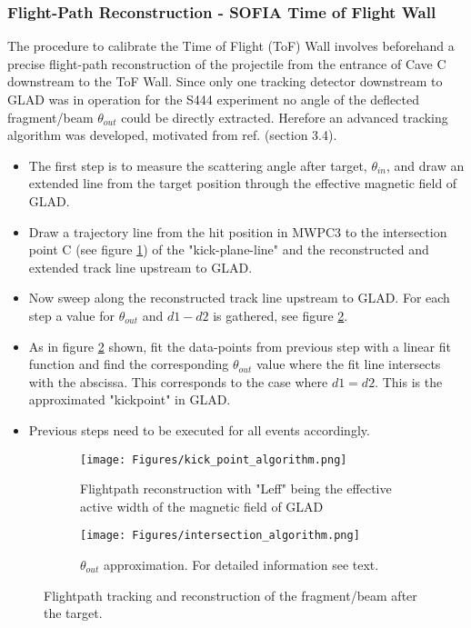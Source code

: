\subsubsection{Flight-Path Reconstruction - SOFIA Time of Flight Wall}
The procedure to calibrate the Time of Flight (ToF) Wall involves beforehand a precise flight-path reconstruction of the projectile from the entrance of Cave C downstream to the ToF Wall. Since only one tracking detector downstream to GLAD was in operation for the S444 experiment no angle of the deflected fragment/beam $\theta_{out}$ could be directly extracted. Herefore an advanced tracking algorithm was developed, motivated from ref. \cite{bertini2013study} (section 3.4). 
\begin{itemize}
\item The first step is to measure the scattering angle after target, $\theta_{in}$, and draw an extended line from the target position through the effective magnetic field of GLAD.  
\item Draw a trajectory line from the hit position in MWPC3 to the intersection point C (see figure \ref{fig:sub1_reco_path}) of the "kick-plane-line" and the reconstructed and extended track line upstream to GLAD.
\item Now sweep along the reconstructed track line upstream to GLAD. For each step a value for $\theta_{out}$ and $d1-d2$ is gathered, see figure \ref{fig:sub2_reco_path}.
\item As in figure \ref{fig:sub2_reco_path} shown, fit the data-points from previous step with a linear fit function and find the corresponding $\theta_{out}$ value where the fit line intersects with the abscissa. This corresponds to the case where $d1 = d2$. This is the approximated "kickpoint" in GLAD. 
\item Previous steps need to be executed for all events accordingly.
\end{itemize}
\begin{figure}[ht]
    \centering
    \begin{subfigure}[b]{0.70\textwidth}
        \texttt{[image: Figures/kick\_point\_algorithm.png]}
        \caption{Flightpath reconstruction with "Leff" being the effective active width of the magnetic field of GLAD}
        \label{fig:sub1_reco_path}
    \end{subfigure}
    \begin{subfigure}[b]{0.25\textwidth}
        \texttt{[image: Figures/intersection\_algorithm.png]}
        \caption{$\theta_{out}$ approximation. For detailed information see text.}
        \label{fig:sub2_reco_path}
    \end{subfigure}

    \caption{Flightpath tracking and reconstruction of the fragment/beam after the target.}
    \label{fig:reco_path}
\end{figure}

